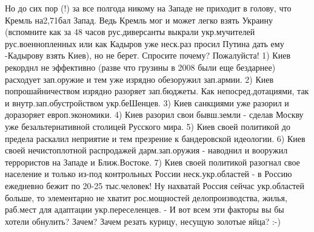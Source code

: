 Но до сих пор (!) за все полгода никому на Западе не приходит в голову, что Кремль на2,71бал Запад.
Ведь Кремль мог и может легко взять Украину (вспомните как за 48 часов рус.диверсанты выкрали укр.мучителей рус.военнопленных или как Кадыров уже неск.раз просил Путина дать ему -Кадырову взять Киев), но не берет. Спросите почему? Пожалуйста!
1) Киев рекорднл не эффективно (разве что грузины в 2008 были еще бездарнее) расходует зап.оружие и тем уже изрядно обезоружил зап.армии.
2) Киев попрошайничеством изрядно разоряет зап.бюджеты. Как непосред.дотациями, так и внутр.зап.обустройством укр.беШенцев.
3) Киев санкциями уже разорил и доразоряет европ.экономики.
4) Киев разорил свои бывш.земли - сделав Москву уже безальтернативной столицей Русского мира.
5) Киев своей политикой до предела раскалил неприятие и тем презрение к бандеровской идеологии.
6) Киев своей нечистоплотной распродажей дарм.зап.оружия - наводнил и вооружил террористов на Западе и Ближ.Востоке.
7) Киев своей политикой разогнал свое население и только из-под контрольных России неск.укр.областей - в Россию ежедневно бежит по 20-25 тыс.человек! Ну нахватай Россия сейчас укр.областей больше, то элементарно не хватит рос.мощностей делопроизводства, жилья, раб.мест для адаптации укр.переселенцев.
-
И вот всем эти факторы вы бы хотели обнулить? Зачем? Зачем резать курицу, несущую золотые яйца? :-)

